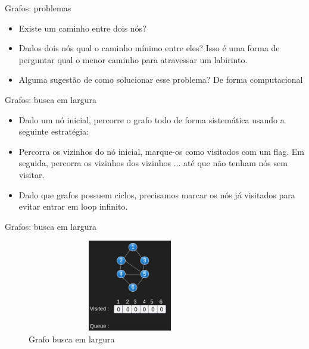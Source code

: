 \begin{frame}
	\begin{block}{Grafos: problemas}
		\begin{itemize}
			\item Existe um caminho entre dois nós?
			\item Dados dois nós qual o caminho mínimo entre eles? Isso é uma forma de perguntar qual o menor caminho para atravessar um labirinto.	
			\item Alguma sugestão de como solucionar esse problema? De forma computacional
		\end{itemize}
	\end{block}
\end{frame}

\begin{frame}
	\begin{block}{Grafos: busca em largura}
		\begin{itemize}
			\item Dado um nó inicial, percorre o grafo todo de forma sistemática usando a seguinte estratégia:	
			\item Percorra os vizinhos do nó inicial, marque-os como visitados com um flag. Em seguida, percorra os vizinhos dos vizinhos $\ldots$ até que não tenham nós sem visitar.	
			\item Dado que grafos possuem ciclos, precisamos marcar os nós já visitados para evitar entrar em loop infinito.
		\end{itemize}
	\end{block}
\end{frame}


\begin{frame}
	\begin{block}{Grafos: busca em largura}
		\begin{figure}[!htb]
			\centering	  
			\includegraphics[height=4cm, width = 9cm]{./pic/bfs1.png}
			\caption{Grafo busca em largura}
		\end{figure}
	\end{block}
\end{frame}

